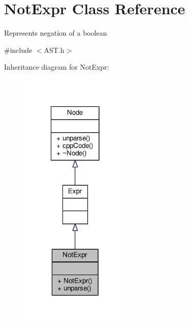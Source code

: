 \hypertarget{classNotExpr}{\section{Not\-Expr Class Reference}
\label{classNotExpr}
}


Represents negation of a boolean \par
  




{\ttfamily \#include $<$A\-S\-T.\-h$>$}



Inheritance diagram for Not\-Expr\-:\nopagebreak
\begin{figure}[H]
\begin{center}
\leavevmode
\includegraphics[width=150pt]{classNotExpr__inherit__graph}
\end{center}
\end{figure}


